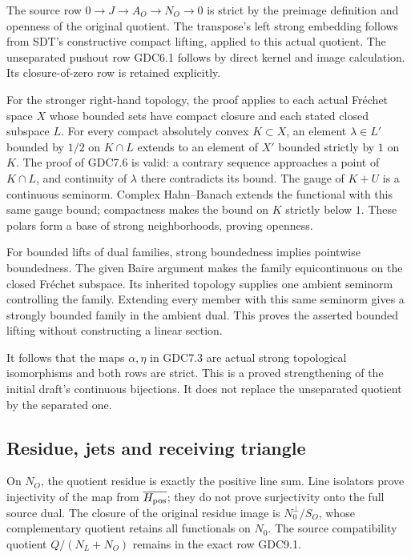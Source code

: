 The source row \(0\to J\to A_O\to N_O\to0\) is strict by the preimage
definition and openness of the original quotient. The transpose's left
strong embedding follows from SDT's constructive compact lifting,
applied to this actual quotient. The unseparated pushout row GDC6.1
follows by direct kernel and image calculation. Its closure-of-zero row
is retained explicitly.

For the stronger right-hand topology, the proof applies to each actual
Fréchet space \(X\) whose bounded sets have compact closure and each
stated closed subspace \(L\). For every compact absolutely convex
\(K\subset X\), an element \(\lambda\in L'\) bounded by \(1/2\) on
\(K\cap L\) extends to an element of \(X'\) bounded strictly by \(1\) on
\(K\). The proof of GDC7.6 is valid: a contrary sequence approaches a
point of \(K\cap L\), and continuity of \(\lambda\) there contradicts
its bound. The gauge of \(K+U\) is a continuous seminorm. Complex
Hahn--Banach extends the functional with this same gauge bound;
compactness makes the bound on \(K\) strictly below \(1\). These polars
form a base of strong neighborhoods, proving openness.

For bounded lifts of dual families, strong boundedness implies pointwise
boundedness. The given Baire argument makes the family equicontinuous on
the closed Fréchet subspace. Its inherited topology supplies one ambient
seminorm controlling the family. Extending every member with this same
seminorm gives a strongly bounded family in the ambient dual. This
proves the asserted bounded lifting without constructing a linear
section.

It follows that the maps \(\alpha,\eta\) in GDC7.3 are actual strong
topological isomorphisms and both rows are strict. This is a proved
strengthening of the initial draft's continuous bijections. It does not
replace the unseparated quotient by the separated one.

\subsection{Residue, jets and receiving
triangle}\label{residue-jets-and-receiving-triangle}

On \(N_O\), the quotient residue is exactly the positive line sum. Line
isolators prove injectivity of the map from \(\overline{H_{\rm pos}}\);
they do not prove surjectivity onto the full source dual. The closure of
the original residue image is \(N_0^\perp/S_O\), whose complementary
quotient retains all functionals on \(N_0\). The source compatibility
quotient \(Q/(N_L+N_O)\) remains in the exact row GDC9.1.

